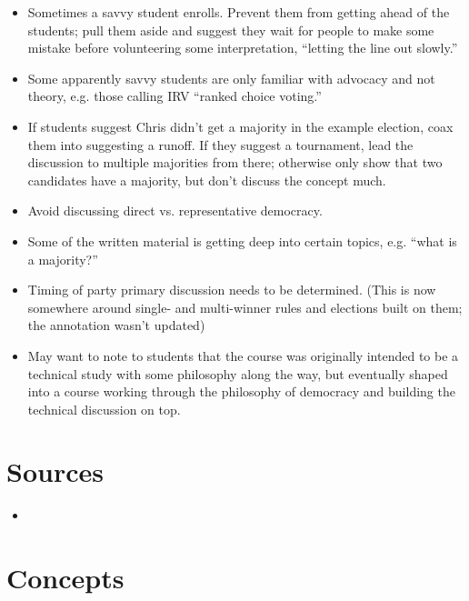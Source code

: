 \begin{itemize}
    \item Sometimes a savvy student enrolls.  Prevent them from getting ahead of the students; pull them aside and suggest they wait for people to make some mistake before volunteering some interpretation, ``letting the line out slowly.''

    \item Some apparently savvy students are only familiar with advocacy and not theory, e.g. those calling IRV ``ranked choice voting.''

    \item If students suggest Chris didn't get a majority in the example election, coax them into suggesting a runoff.  If they suggest a tournament, lead the discussion to multiple majorities from there; otherwise only show that two candidates have a majority, but don't discuss the concept much.

    \item Avoid discussing direct vs. representative democracy.

    \item Some of the written material is getting deep into certain topics, e.g. ``what is a majority?''

    \item Timing of party primary discussion needs to be determined.  (This is now somewhere around single- and multi-winner rules and elections built on them; the annotation wasn't updated)

    \item May want to note to students that the course was originally intended to be a technical study with some philosophy along the way, but eventually shaped into a course working through the philosophy of democracy and building the technical discussion on top.


\end{itemize}

\section{Sources}

\begin{itemize}
    \item \autocite{Kassner2006}
\end{itemize}

\section{Concepts}

